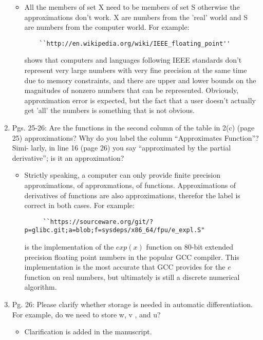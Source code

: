 \documentclass{article}
\begin{document}
\begin{enumerate}
{\color{red}  
\begin{itemize}
     \item

     All the members of set X need to be members of set S otherwise the
     approximations don't work. X are numbers from the 'real' world and S are
     numbers from the computer world. For example:

     \begin{verbatim}
    ``http://en.wikipedia.org/wiki/IEEE_floating_point''
     \end{verbatim}
     
     shows that computers
     and languages following IEEE standards don't represent very large numbers
     with very fine precision at the same time due to memory constraints, and
     there are upper and lower bounds on the magnitudes of nonzero numbers that
     can be represented. Obviously, approximation error is expected, but the
     fact that a user doesn't actually get 'all' the numbers is something that
     is not obvious.

  \end{itemize}}


\item
    Pgs. 25-26: Are the functions in the second column of the table in 2(c) (page 25)
    approximations? Why do you label the column “Approximates Function”? Simi-
    larly, in line 16 (page 26) you say “approximated by the partial derivative”; is it an
    approximation?

{\color{red}  
\begin{itemize}
     \item

      Strictly speaking, a computer can only provide finite precision
      approximations, of approxmations, of functions. Approximations of
      derivatives of functions are also approximations, therefor the label is
      correct in both cases. For example:

      \begin{verbatim}
     ``https://sourceware.org/git/?p=glibc.git;a=blob;f=sysdeps/x86_64/fpu/e_expl.S"
      \end{verbatim}

      is the implementation of the $exp(x)$ function on 80-bit extended
      precision floating point numbers in the popular GCC compiler. This
      implementation is the most accurate that GCC provides for the $e$
      function on real numbers, but ultimately is still a discrete numerical
      algorithm.

  \end{itemize}}

  \item
Pg. 26: Please clarify whether storage is needed in automatic differentiation. For
example, do we need to store w, v , and u?

{\color{red}  
\begin{itemize}
     \item
      Clarification is added in the manuscript.  
  \end{itemize}}

\end{enumerate}
\end{document}
